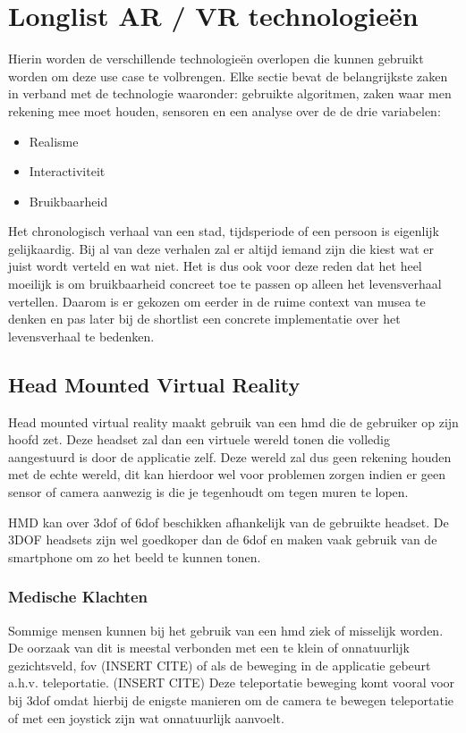 \chapter{Longlist AR / VR technologieën}
\label{ch:longlist}

Hierin worden de verschillende technologieën overlopen die kunnen gebruikt worden om deze use case te volbrengen.
Elke sectie bevat de belangrijkste zaken in verband met de technologie waaronder: gebruikte algoritmen, zaken waar men rekening mee moet houden, sensoren en een analyse over de de drie variabelen:

\begin{itemize}
    \item Realisme
    \item Interactiviteit
    \item Bruikbaarheid
\end{itemize}

Het chronologisch verhaal van een stad, tijdsperiode of een persoon is eigenlijk gelijkaardig. Bij al van deze verhalen zal er altijd iemand zijn die kiest wat er juist wordt verteld en wat niet. Het is dus ook voor deze reden dat het heel moeilijk is om bruikbaarheid concreet toe te passen op alleen het levensverhaal vertellen. Daarom is er gekozen om eerder in de ruime context van musea te denken en pas later bij de shortlist een concrete implementatie over het levensverhaal te bedenken. 

\section{Head Mounted Virtual Reality}
Head mounted virtual reality maakt gebruik van een \acrshort{hmd} die de gebruiker op zijn hoofd zet. Deze headset zal dan een virtuele wereld tonen die volledig aangestuurd is door de applicatie zelf. Deze wereld zal dus geen rekening houden met de echte wereld, dit kan hierdoor wel voor problemen zorgen indien er geen sensor of camera aanwezig is die je tegenhoudt om tegen muren te lopen.

HMD kan over \acrshort{3dof} of \acrshort{6dof} beschikken afhankelijk van de gebruikte headset. De 3DOF headsets zijn wel goedkoper dan de \acrshort{6dof} en maken vaak gebruik van de smartphone om zo het beeld te kunnen tonen. 
\subsection{Medische Klachten}
Sommige mensen kunnen bij het gebruik van een \acrshort{hmd} ziek of misselijk worden. De oorzaak van dit is meestal verbonden met een te klein of onnatuurlijk gezichtsveld, \acrfull{fov} (INSERT CITE) of als de beweging in de applicatie gebeurt a.h.v. teleportatie. (INSERT CITE) Deze teleportatie beweging komt vooral voor bij \acrshort{3dof} omdat hierbij de enigste manieren om de camera te bewegen teleportatie of met een joystick zijn wat onnatuurlijk aanvoelt.


